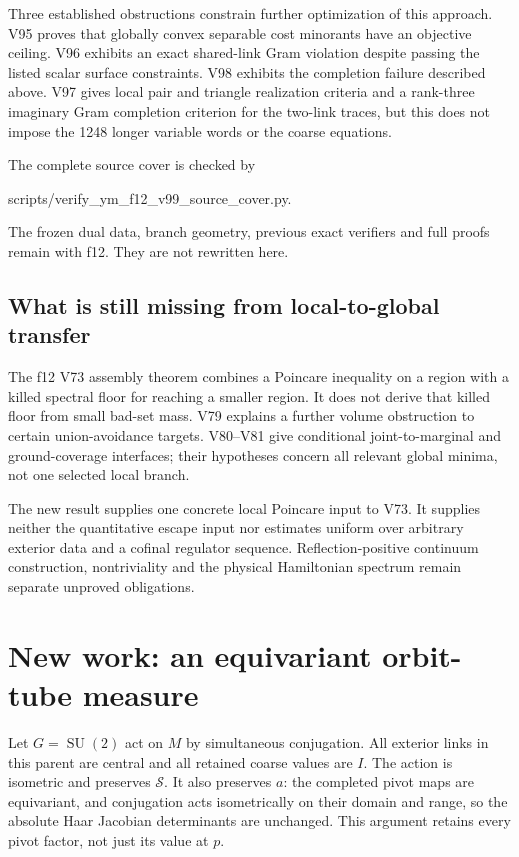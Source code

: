\documentclass[11pt,oneside]{article}
\DeclareMathOperator{\SU}{SU}
\newcommand{\cS}{\mathcal S}
\begin{document}
Three established obstructions constrain further
optimization of this approach. V95 proves that
globally convex separable cost minorants have
an objective ceiling. V96 exhibits an exact
shared-link Gram violation despite passing
the listed scalar surface constraints. V98
exhibits the completion failure described above.
V97 gives local pair and triangle realization
criteria and a rank-three imaginary Gram
completion criterion for the two-link traces,
but this does not impose the 1248 longer
variable words or the coarse equations.

The complete source cover is checked by
\begin{center}\small\ttfamily
scripts/verify\_ym\_f12\_v99\_source\_cover.py.
\end{center}
The frozen dual data, branch geometry, previous
exact verifiers and full proofs remain with f12.
They are not rewritten here.

\subsection{What is still missing from local-to-global transfer}

The f12 V73 assembly theorem combines a Poincare
inequality on a region with a killed spectral
floor for reaching a smaller region. It does
not derive that killed floor from small bad-set
mass. V79 explains a further volume obstruction
to certain union-avoidance targets. V80--V81
give conditional joint-to-marginal and
ground-coverage interfaces; their hypotheses
concern all relevant global minima, not one
selected local branch.

The new result supplies one concrete local
Poincare input to V73. It supplies neither
the quantitative escape input nor estimates
uniform over arbitrary exterior data and a
cofinal regulator sequence. Reflection-positive
continuum construction, nontriviality and the
physical Hamiltonian spectrum remain separate
unproved obligations.

\section{New work: an equivariant orbit-tube measure}

Let \(G=\SU(2)\) act on \(M\) by simultaneous
conjugation. All exterior links in this parent
are central and all retained coarse values
are \(I\). The action is isometric and preserves
\(\cS\). It also preserves \(a\): the completed
pivot maps are equivariant, and conjugation
acts isometrically on their domain and range,
so the absolute Haar Jacobian determinants
are unchanged. This argument retains every
pivot factor, not just its value at \(p\).
\end{document}
